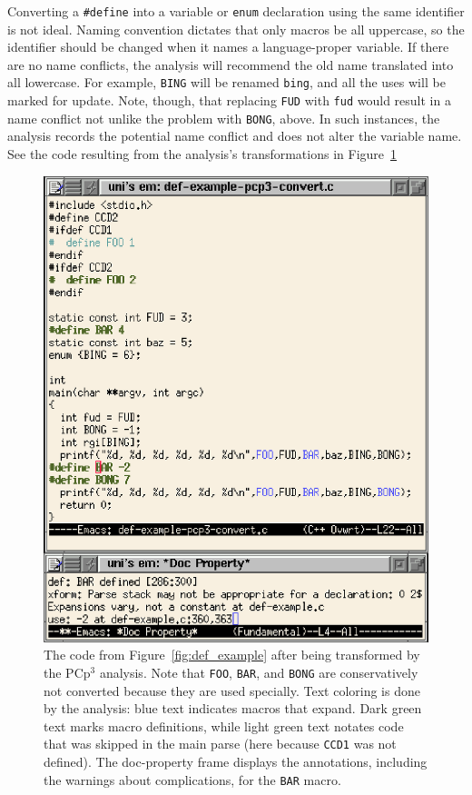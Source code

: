\documentclass{article}
\newcommand{\pcp}{\mbox{\textsf{PCp}$^3$}}
\newcommand{\ppd}[1]{\texttt{\##1}}
\newcommand{\figref}[1]{Figure~\ref{#1}}
\begin{document}
Converting a \ppd{define} into a variable or \texttt{enum} declaration
using the same identifier is not ideal.  Naming convention dictates that only
macros be all uppercase, so the identifier should be changed when it
names a language-proper variable.  If there are no name conflicts, the analysis will recommend
the old name translated into all lowercase.  For example, \texttt{BING} will be renamed
\texttt{bing}, and all the uses will be marked for update.  Note, though, that
replacing \texttt{FUD} with \texttt{fud} would result in a name conflict
not unlike the problem with \texttt{BONG}, above.  In such instances,
the analysis records the potential name conflict and does not
alter the variable name.  See the code resulting from the analysis's
transformations in \figref{fig:xformed}

\begin{figure}[p]
  \begin{center}
    \leavevmode
    \includegraphics{figs/xformed.ps}
    \caption{The code from \figref{fig:def_example} after being transformed
      by the \pcp{} analysis. Note that \texttt{FOO}, \texttt{BAR}, and
      \texttt{BONG} are conservatively not converted because they are
      used specially.  Text coloring is done by the analysis:  blue text indicates
      macros that expand.  Dark green text marks macro definitions,
      while light green text notates code that was skipped in the main
      parse (here because \texttt{CCD1} was not defined). The
      doc-property frame displays the annotations, including the
      warnings about complications, for the \texttt{BAR} macro.}
    \label{fig:xformed}
  \end{center}
\end{figure}
\end{document}
